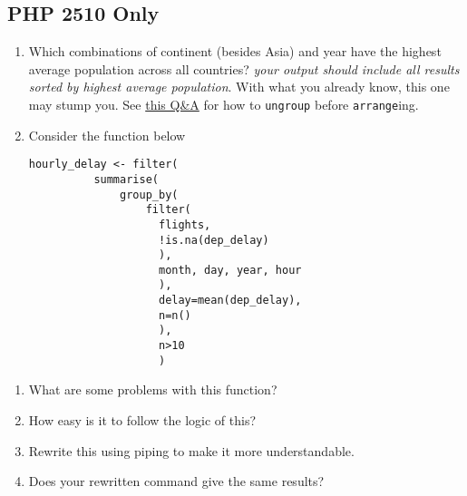 \documentclass[]{article}
\providecommand{\tightlist}{%
  \setlength{\itemsep}{0pt}\setlength{\parskip}{0pt}}
\begin{document}
\subsection{PHP 2510 Only}\label{php-2510-only}

\begin{enumerate}
\def\labelenumi{\arabic{enumi}.}
\setcounter{enumi}{10}
\item
  Which combinations of continent (besides Asia) and year have the
  highest average population across all countries? \emph{your output
  should include all results sorted by highest average population}. With
  what you already know, this one may stump you. See
  \href{http://stackoverflow.com/q/27207963/654296}{this Q\&A} for how
  to \texttt{ungroup} before \texttt{arrange}ing.
\item
  Consider the function below

\begin{verbatim}
hourly_delay <- filter(
          summarise(
              group_by(
                  filter(
                    flights, 
                    !is.na(dep_delay)
                    ),
                    month, day, year, hour
                    ),
                    delay=mean(dep_delay),
                    n=n()
                    ),
                    n>10
                    )
\end{verbatim}
\end{enumerate}

\begin{enumerate}
\def\labelenumi{\alph{enumi}.}
\tightlist
\item
  What are some problems with this function?
\item
  How easy is it to follow the logic of this?
\item
  Rewrite this using piping to make it more understandable.
\item
  Does your rewritten command give the same results?
\end{enumerate}
\end{document}

